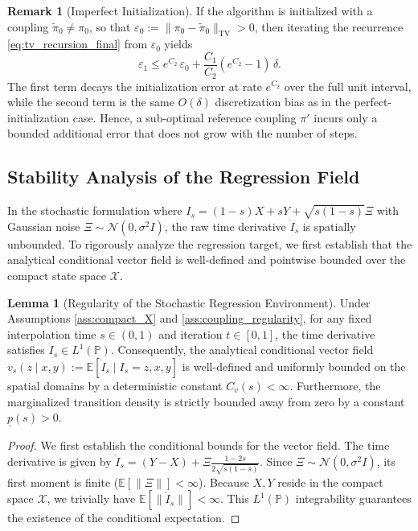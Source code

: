 \documentclass[11pt]{article}
\theoremstyle{definition}
\newtheorem{lemma}[theorem]{Lemma}
\newtheorem{remark}[theorem]{Remark}
\numberwithin{equation}{section}%
\begin{document}
{\begin{remark}[Imperfect Initialization]
\label{rmk:imperfect_init}
If the algorithm is initialized with a coupling $\tilde{\pi}_0 \ne \pi_0$, so that $\varepsilon_0 := \|\pi_0 - \tilde{\pi}_0\|_{\mathrm{TV}} > 0$, then iterating the recurrence \eqref{eq:tv_recursion_final} from $\varepsilon_0$ yields
\begin{equation*}
    \varepsilon_1 \le e^{C_2}\,\varepsilon_0 + \frac{C_1}{C_2}(e^{C_2} - 1)\,\delta.
\end{equation*}
The first term decays the initialization error at rate $e^{C_2}$ over the full unit interval, while the second term is the same $O(\delta)$ discretization bias as in the perfect-initialization case. Hence, a sub-optimal reference coupling $\pi'$ incurs only a bounded additional error that does not grow with the number of steps.
\end{remark}

\subsection{Stability Analysis of the Regression Field}

In the stochastic formulation where $I_s = (1-s)X + sY + \sqrt{s(1-s)} \Xi$ with Gaussian noise $\Xi \sim \mathcal{N}(0, \sigma^2 I)$, the raw time derivative $\dot{I}_s$ is spatially unbounded. To rigorously analyze the regression target, we first establish that the analytical conditional vector field is well-defined and pointwise bounded over the compact state space $\mathcal{X}$.

\begin{lemma}[Regularity of the Stochastic Regression Environment]
\label{lem:beta_environment_regularity}
Under Assumptions \ref{ass:compact_X} and \ref{ass:coupling_regularity}, for any fixed interpolation time $s \in (0,1)$ and iteration $t \in [0,1]$, the time derivative satisfies $\dot{I}_s \in L^1(\mathbb{P})$. Consequently, the analytical conditional vector field $v_s(z \mid x,y) := \mathbb{E}[\dot{I}_s \mid I_s=z, x, y]$ is well-defined and uniformly bounded on the spatial domains by a deterministic constant $C_v(s) < \infty$. Furthermore, the marginalized transition density is strictly bounded away from zero by a constant $\underline{p}(s) > 0$.
\end{lemma}

\begin{proof}
We first establish the conditional bounds for the vector field. The time derivative is given by $\dot{I}_s = (Y - X) + \Xi \frac{1-2s}{2\sqrt{s(1-s)}}$. Since $\Xi \sim \mathcal{N}(0, \sigma^2 I)$, its first moment is finite ($\mathbb{E}[\|\Xi\|] < \infty$). Because $X, Y$ reside in the compact space $\mathcal{X}$, we trivially have $\mathbb{E}[\|\dot{I}_s\|] < \infty$. This $L^1(\mathbb{P})$ integrability guarantees the existence of the conditional expectation. 


\end{proof}}
\end{document}
